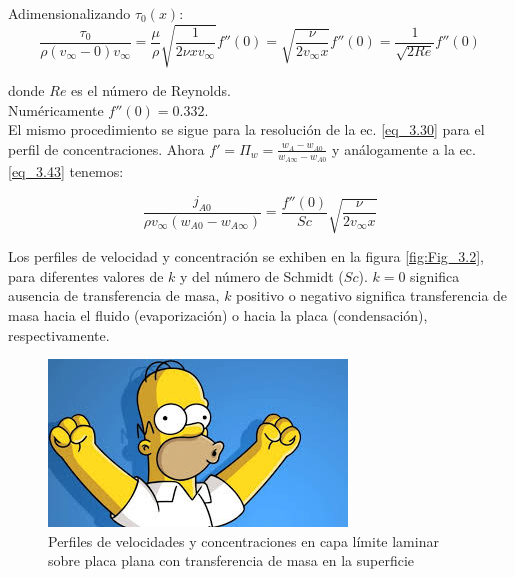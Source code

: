 Adimensionalizando $\tau_0(x)$: 
	\begin{equation}
\frac{\tau_0}{\rho (v_\infty - 0) v_\infty} = \frac{\mu}{\rho}  \sqrt{\frac{1}{2 \nu x v_\infty}} f''(0) = \sqrt{\frac{\nu}{2 v_\infty x}} f''(0) = \frac{1}{\sqrt{2 Re}} f''(0)
	\label{eq_3.43}
\end{equation}

donde $Re$ es el número de Reynolds.\\

Numéricamente $f''(0) = 0.332$.\\

El mismo procedimiento se sigue para la resolución de la ec. \eqref{eq_3.30} para el perfil de concentraciones. Ahora $f' = \Pi_w = \frac{w_A - w_{A0}}{w_{A \infty} - w_{A0}}$ y análogamente a la ec. \eqref{eq_3.43} tenemos:

\begin{equation}
	\frac{j_{A0}}{\rho v_\infty (w_{A0}- w_{A\infty})} = \frac{f''(0)}{Sc} \sqrt{\frac{\nu}{2 v_\infty x}}
	\label{eq_3.44}
\end{equation}

Los perfiles de velocidad y concentración se exhiben en la figura \eqref{fig:Fig_3.2}, para diferentes valores de $k$ y del número de Schmidt ($Sc$). $k=0$ significa ausencia de transferencia de masa, $k$ positivo o negativo significa transferencia de masa hacia el fluido (evaporización) o hacia la placa (condensación), respectivamente.

\begin{figure}[H]
	\center
	\includegraphics[scale=0.5]{./Capitulo3/Imagenes/Fig_3.2.JPG}
	\caption{Perfiles de velocidades y concentraciones en capa límite laminar sobre placa plana con transferencia de masa en la superficie} 
	 \label{fig:Fig_3.3}
\end{figure}
